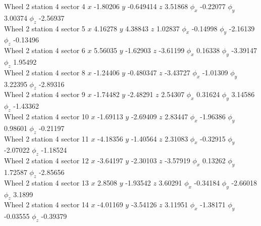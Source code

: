 \documentclass[compress]{beamer}
\begin{document}
\begin{frame}
Wheel 2 station 4 sector 4 $x$ -1.80206 $y$ -0.649414 $z$ 3.51868 $\phi_x$ -0.22077 $\phi_y$ 3.00374 $\phi_z$ -2.56937 \\
Wheel 2 station 4 sector 5 $x$ 4.16278 $y$ 4.38843 $z$ 1.02837 $\phi_x$ -0.14998 $\phi_y$ -2.16139 $\phi_z$ -0.13496 \\
Wheel 2 station 4 sector 6 $x$ 5.56035 $y$ -1.62903 $z$ -3.61199 $\phi_x$ 0.16338 $\phi_y$ -3.39147 $\phi_z$ 1.95492 \\
Wheel 2 station 4 sector 8 $x$ -1.24406 $y$ -0.480347 $z$ -3.43727 $\phi_x$ -1.01309 $\phi_y$ 3.22395 $\phi_z$ -2.89316 \\
Wheel 2 station 4 sector 9 $x$ -1.74482 $y$ -2.48291 $z$ 2.54307 $\phi_x$ 0.31624 $\phi_y$ 3.14586 $\phi_z$ -1.43362 \\
Wheel 2 station 4 sector 10 $x$ -1.69113 $y$ -2.69409 $z$ 2.83447 $\phi_x$ -1.96386 $\phi_y$ 0.98601 $\phi_z$ -0.21197 \\
Wheel 2 station 4 sector 11 $x$ -4.18356 $y$ -1.40564 $z$ 2.31083 $\phi_x$ -0.32915 $\phi_y$ -2.07022 $\phi_z$ -1.18524 \\
Wheel 2 station 4 sector 12 $x$ -3.64197 $y$ -2.30103 $z$ -3.57919 $\phi_x$ 0.13262 $\phi_y$ 1.72587 $\phi_z$ -2.85656 \\
Wheel 2 station 4 sector 13 $x$ 2.8508 $y$ -1.93542 $z$ 3.60291 $\phi_x$ -0.34184 $\phi_y$ -2.66018 $\phi_z$ 3.1899 \\
Wheel 2 station 4 sector 14 $x$ -4.01169 $y$ -3.54126 $z$ 3.11951 $\phi_x$ -1.38171 $\phi_y$ -0.03555 $\phi_z$ -0.39379 \\

\end{frame}
\end{document}
